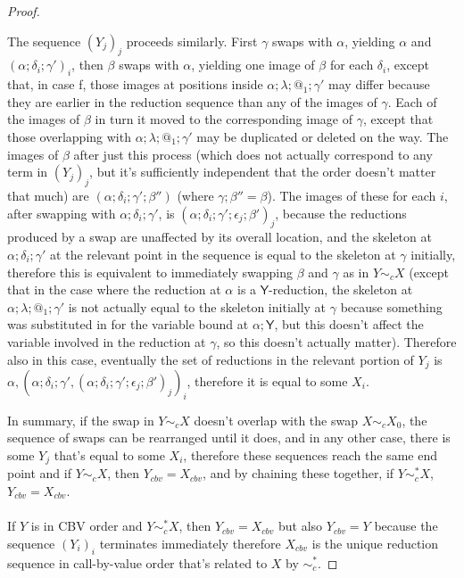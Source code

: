 \documentclass{article}
\newcommand{\tY}{\mathsf{Y}}
\theoremstyle{definition}
\theoremstyle{lemma}
\theoremstyle{remark}
\begin{document}
\begin{proof}
\begin{itemize}
  The sequence $(Y_j)_j$ proceeds similarly. First $\gamma$ swaps with $\alpha$, yielding $\alpha$ and $(\alpha;\delta_i;\gamma')_i$, then $\beta$ swaps with $\alpha$, yielding one image of $\beta$ for each $\delta_i$, except that, in case f, those images at positions inside $\alpha;\lambda;@_1;\gamma'$ may differ because they are earlier in the reduction sequence than any of the images of $\gamma$. Each of the images of $\beta$ in turn it moved to the corresponding image of $\gamma$, except that those overlapping with $\alpha;\lambda;@_1;\gamma'$ may be duplicated or deleted on the way. The images of $\beta$ after just this process (which does not actually correspond to any term in $(Y_j)_j$, but it's sufficiently independent that the order doesn't matter that much) are $(\alpha;\delta_i;\gamma';\beta'')$ (where $\gamma;\beta'' = \beta$). The images of these for each $i$, after swapping with $\alpha;\delta_i;\gamma'$, is $(\alpha;\delta_i;\gamma';\epsilon_j;\beta')_j$, because the reductions produced by a swap are unaffected by its overall location, and the skeleton at $\alpha;\delta_i;\gamma'$ at the relevant point in the sequence is equal to the skeleton at $\gamma$ initially, therefore this is equivalent to immediately swapping $\beta$ and $\gamma$ as in $Y \sim_c X$ (except that in the case where the reduction at $\alpha$ is a $\tY$-reduction, the skeleton at $\alpha;\lambda;@_1;\gamma'$ is not actually equal to the skeleton initially at $\gamma$ because something was substituted in for the variable bound at $\alpha;\tY$, but this doesn't affect the variable involved in the reduction at $\gamma$, so this doesn't actually matter). Therefore also in this case, eventually the set of reductions in the relevant portion of $Y_j$ is $\alpha, (\alpha;\delta_i;\gamma', (\alpha;\delta_i;\gamma';\epsilon_j;\beta')_j)_i$, therefore it is equal to some $X_i$.
\end{itemize}
In summary, if the swap in $Y \sim_c X$ doesn't overlap with the swap $X \sim_c X_0$, the sequence of swaps can be rearranged until it does, and in any other case, there is some $Y_j$ that's equal to some $X_i$, therefore these sequences reach the same end point and if $Y \sim_c X$, then $Y_{cbv} = X_{cbv}$, and by chaining these together, if $Y \sim_c^* X$, $Y_{cbv} = X_{cbv}$.

\paragraph{}
If $Y$ is in CBV order and $Y \sim_c^* X$, then $Y_{cbv} = X_{cbv}$ but also $Y_{cbv} = Y$ because the sequence $(Y_i)_i$ terminates immediately therefore $X_{cbv}$ is the unique reduction sequence in call-by-value order that's related to $X$ by $\sim_c^*$.
\end{proof}
\end{document}
